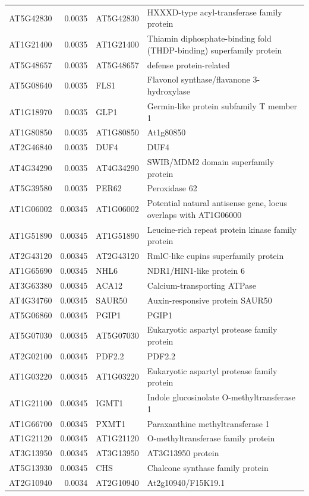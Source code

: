 \documentclass[11pt]{article}
\begin{document}
\begin{center}
\begin{tabular}{lrll}
AT5G42830 & 0.0035 & AT5G42830 & HXXXD-type acyl-transferase family protein\\
AT1G21400 & 0.0035 & AT1G21400 & Thiamin diphosphate-binding fold (THDP-binding) superfamily protein\\
AT5G48657 & 0.0035 & AT5G48657 & defense protein-related\\
AT5G08640 & 0.0035 & FLS1 & Flavonol synthase/flavanone 3-hydroxylase\\
AT1G18970 & 0.0035 & GLP1 & Germin-like protein subfamily T member 1\\
AT1G80850 & 0.0035 & AT1G80850 & At1g80850\\
AT2G46840 & 0.0035 & DUF4 & DUF4\\
AT4G34290 & 0.0035 & AT4G34290 & SWIB/MDM2 domain superfamily protein\\
AT5G39580 & 0.0035 & PER62 & Peroxidase 62\\
AT1G06002 & 0.00345 & AT1G06002 & Potential natural antisense gene, locus overlaps with AT1G06000\\
AT1G51890 & 0.00345 & AT1G51890 & Leucine-rich repeat protein kinase family protein\\
AT2G43120 & 0.00345 & AT2G43120 & RmlC-like cupins superfamily protein\\
AT1G65690 & 0.00345 & NHL6 & NDR1/HIN1-like protein 6\\
AT3G63380 & 0.00345 & ACA12 & Calcium-transporting ATPase\\
AT4G34760 & 0.00345 & SAUR50 & Auxin-responsive protein SAUR50\\
AT5G06860 & 0.00345 & PGIP1 & PGIP1\\
AT5G07030 & 0.00345 & AT5G07030 & Eukaryotic aspartyl protease family protein\\
AT2G02100 & 0.00345 & PDF2.2 & PDF2.2\\
AT1G03220 & 0.00345 & AT1G03220 & Eukaryotic aspartyl protease family protein\\
AT1G21100 & 0.00345 & IGMT1 & Indole glucosinolate O-methyltransferase 1\\
AT1G66700 & 0.00345 & PXMT1 & Paraxanthine methyltransferase 1\\
AT1G21120 & 0.00345 & AT1G21120 & O-methyltransferase family protein\\
AT3G13950 & 0.00345 & AT3G13950 & AT3G13950 protein\\
AT5G13930 & 0.00345 & CHS & Chalcone synthase family protein\\
AT2G10940 & 0.0034 & AT2G10940 & At2g10940/F15K19.1\\

\end{tabular}
\end{center}
\end{document}
